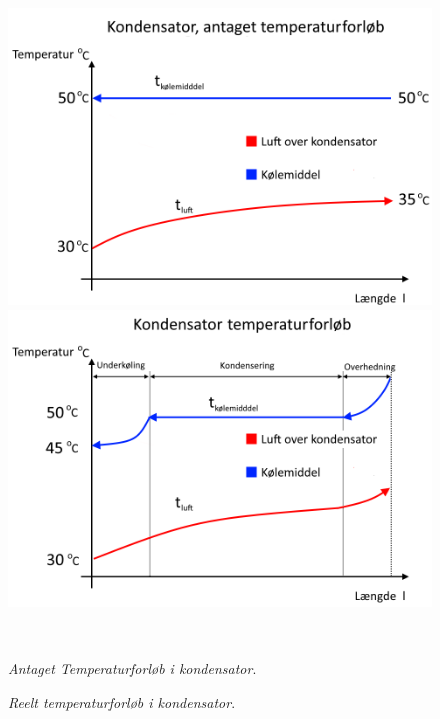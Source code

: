 \documentclass[../Hovedrapport.tex]{subfiles}
\begin{document}
\begin{figure}[H]
	\centering
	\begin{minipage}[b]{0.505\textwidth}
	\centering
	\includegraphics[width=1.00\textwidth]{Billeder/temp_kondens.png} %
	\end{minipage}
	\hfill
	\begin{minipage}[b]{0.485\textwidth}
	\centering
	\includegraphics[width=1.00\textwidth]{Billeder/temp_kondens_reel.png} %
	\end{minipage}
	\\ %
	\begin{minipage}[t]{0.45\textwidth}
	\caption{\textit{Antaget Temperaturforløb i kondensator}.} %
	\label{fig:Konden_tempforloeb_antaget}
	\end{minipage}
	\hfill
	\begin{minipage}[t]{0.45\textwidth}
	\caption{\textit{Reelt temperaturforløb i kondensator}.} %
	\label{fig:Konden_tempforloeb_reel}
	\end{minipage}
\end{figure}
\end{document}
